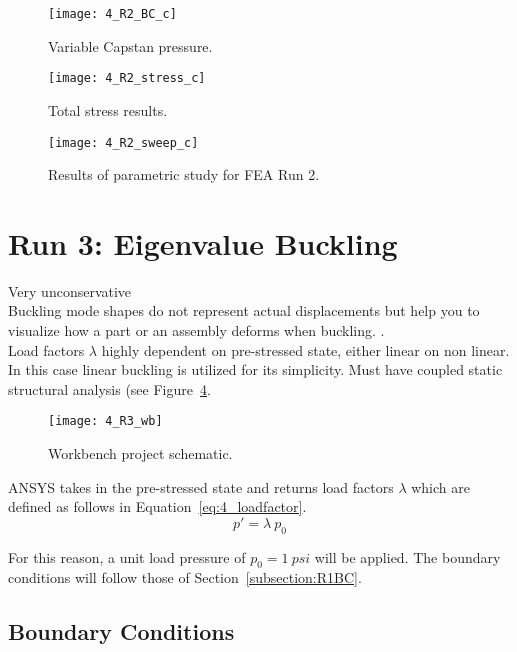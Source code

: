 \begin{figure}[H]
	\centering
	\texttt{[image: 4\_R2\_BC\_c]}
	\caption{Variable Capstan pressure.}
	\label{fig:4_R2_BC_c}
\end{figure}

\begin{figure}[H]
	\centering
	\texttt{[image: 4\_R2\_stress\_c]}
	\caption{Total stress results.}
	\label{fig:4_R2_stress_c}
\end{figure}


\begin{figure}[H]
	\centering
	\texttt{[image: 4\_R2\_sweep\_c]}
	\caption{Results of parametric study for FEA Run 2.}
	\label{fig:4_R2_sweep}
\end{figure}

\section{Run 3: Eigenvalue Buckling}
\label{section:4_R3}
Very unconservative \\

Buckling mode shapes do not represent actual displacements but help you to visualize how a part or an assembly deforms when buckling. \cite{ANSYS}. \\

Load factors $\lambda$ highly dependent on pre-stressed state, either linear on non linear.\\

In this case linear buckling is utilized for its simplicity. Must have coupled static structural analysis (see Figure~\ref{fig:4_R3_wb}.

\begin{figure}[H]
	\centering
	\texttt{[image: 4\_R3\_wb]}
	\caption{Workbench project schematic.}
	\label{fig:4_R3_wb}
\end{figure}

ANSYS takes in the pre-stressed state and returns load factors $\lambda$ which are defined as follows in Equation~\ref{eq:4_loadfactor}.
\begin{equation}
	\label{eq:4_loadfactor}
	p' = \lambda \ p_0
\end{equation}

For this reason, a unit load pressure of $p_0 = 1\ psi$ will be applied. The boundary conditions will follow those of Section~\ref{subsection:R1BC}.

\subsection{Boundary Conditions}

